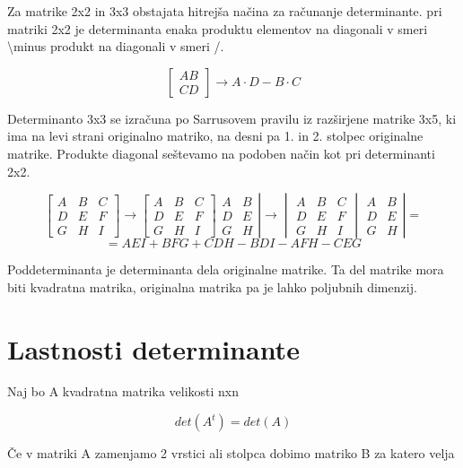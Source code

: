 \documentclass[12pt]{report}
\begin{document}
Za matrike 2x2 in 3x3 obstajata hitrejša načina za računanje determinante. pri matriki 2x2 je determinanta enaka produktu elementov na diagonali v smeri \textbackslash minus produkt na diagonali v smeri /.


\[
\begin{bmatrix} A B \\ C D \end{bmatrix} \rightarrow A \cdot D - B \cdot C\]

Determinanto 3x3 se izračuna po Sarrusovem pravilu iz razširjene matrike 3x5, ki ima na levi strani originalno matriko, na desni pa 1. in 2. stolpec originalne matrike. Produkte diagonal seštevamo na podoben način kot pri determinanti 2x2.

\[ 
\begin{bmatrix} A & B & C \\ D & E & F \\ G & H & I \end{bmatrix} \rightarrow
\begin{bmatrix} A & B & C\\D & E & F\\G & H & I \end{bmatrix}\left.
\begin{matrix} A & B \\ D & E \\ G & H \end{matrix}\right|\rightarrow
\begin{vmatrix} A & B & C\\  D & E & F\\  G &H &I \end{vmatrix}\left.
\begin{matrix} A & B \\  D & E \\  G & H \end{matrix}\right| =
\]
\bigbreak
\[
= AEI+BFG+CDH-BDI-AFH-CEG
\]


Poddeterminanta je determinanta dela originalne matrike. Ta del matrike mora biti kvadratna matrika, originalna matrika pa je lahko poljubnih dimenzij.


\section*{Lastnosti determinante}
Naj bo A kvadratna matrika velikosti nxn

\[det(A^{t}) = det(A)\]

Če v matriki A zamenjamo 2 vrstici ali stolpca dobimo matriko B za katero velja
\end{document}
